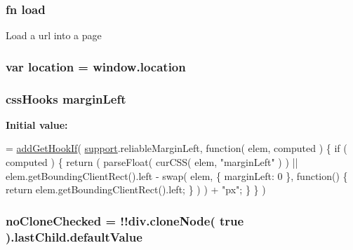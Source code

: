 \subsubsection[{\texorpdfstring{load}{load}}]{ {\bf fn} load}\hypertarget{jquery-3_82_81_8js_a8d0b9ec82c308161432f1c387d2fc2a7}{}\label{jquery-3_82_81_8js_a8d0b9ec82c308161432f1c387d2fc2a7}
Load a url into a page 
\subsubsection[{\texorpdfstring{location}{location}}]{\setlength{\rightskip}{0pt plus 5cm}var location = window.\+location}\hypertarget{jquery-3_82_81_8js_a761c752fb16f7c0bfe1026b787ca0032}{}\label{jquery-3_82_81_8js_a761c752fb16f7c0bfe1026b787ca0032}
\subsubsection[{\texorpdfstring{margin\+Left}{marginLeft}}]{ css\+Hooks margin\+Left}\hypertarget{jquery-3_82_81_8js_a1ef83a037ddb0cdf2dbc8d1e9d6e830e}{}\label{jquery-3_82_81_8js_a1ef83a037ddb0cdf2dbc8d1e9d6e830e}
{\bfseries Initial value\+:}
\begin{DoxyCode}
= \hyperlink{jquery-3_82_81_8js_afe1f73f86828a8cbdec452c5986d0f1e}{addGetHookIf}( \hyperlink{jquery-3_82_81_8js_ab166c89ccabddfd7c423a7fcb23ca84f}{support}.reliableMarginLeft,
    \textcolor{keyword}{function}( elem, computed ) \{
        if ( computed ) \{
            return ( parseFloat( curCSS( elem, \textcolor{stringliteral}{"marginLeft"} ) ) ||
                elem.getBoundingClientRect().left -
                    swap( elem, \{ marginLeft: 0 \}, function() \{
                        return elem.getBoundingClientRect().left;
                    \} )
                ) + \textcolor{stringliteral}{"px"};
        \}
    \}
)
\end{DoxyCode}
\subsubsection[{\texorpdfstring{no\+Clone\+Checked}{noCloneChecked}}]{ no\+Clone\+Checked = !!{\bf div.\+clone\+Node}( true ).last\+Child.\+default\+Value}\hypertarget{jquery-3_82_81_8js_a46174f6d68b2524637fd67185b97f33a}{}\label{jquery-3_82_81_8js_a46174f6d68b2524637fd67185b97f33a}
